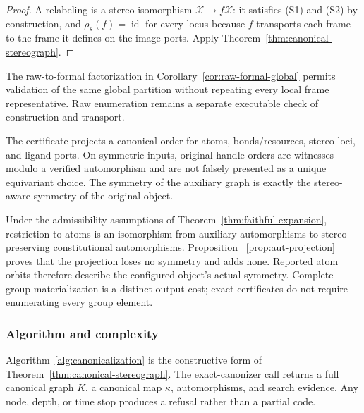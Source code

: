 \documentclass[pdflatex,sn-mathphys-num,referee,lineno]{sn-jnl}
\theoremstyle{plain}
\theoremstyle{remark}
\theoremstyle{definition}
\begin{document}
\begin{proof}
A relabeling is a stereo-isomorphism \(\mathcal X\to f\mathcal X\): it
satisfies (S1) and (S2) by construction, and \(\rho_s(f)=\operatorname{id}\)
for every locus because \(f\) transports each frame to the frame it defines on
the image ports.  Apply Theorem~\ref{thm:canonical-stereograph}.
\end{proof}

The raw-to-formal factorization in Corollary~\ref{cor:raw-formal-global}
permits validation of the same global partition without repeating every local
frame representative. Raw enumeration remains a separate executable check of
construction and transport.

The certificate projects a canonical order for atoms, bonds/resources, stereo
loci, and ligand ports.  On symmetric inputs, original-handle orders are
witnesses modulo a verified automorphism and are not falsely presented as a
unique equivariant choice.  The symmetry of the auxiliary graph is exactly the
stereo-aware symmetry of the original object.

Under the admissibility assumptions of Theorem~\ref{thm:faithful-expansion},
restriction to atoms is an isomorphism from auxiliary automorphisms to
stereo-preserving constitutional automorphisms. Proposition~
\ref{prop:aut-projection} proves that the projection loses no symmetry and adds
none. Reported atom orbits therefore describe the configured object's actual
symmetry. Complete group materialization is a distinct output cost; exact
certificates do not require enumerating every group element.

\subsubsection{Algorithm and complexity}
\label{sec:canon-algorithm}

Algorithm~\ref{alg:canonicalization} is the constructive form of
Theorem~\ref{thm:canonical-stereograph}.  The exact-canonizer call returns a
full canonical graph \(K\), a canonical map \(\kappa\), automorphisms, and
search evidence.  Any node, depth, or time stop produces a refusal rather than
a partial code.
\end{document}
